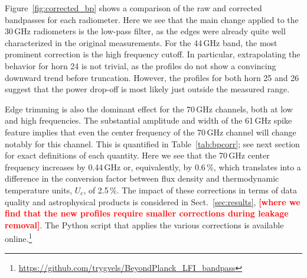 \documentclass[twocolumn]{aa}
\newcommand{\?}[1]{\textcolor{red}{{\bf [#1]}}}
\begin{document}
Figure~\ref{fig:corrected_bp} shows a comparison of the raw and corrected
bandpasses for each radiometer. Here we see that the main change applied to the
30\,GHz radiometers is the low-pass filter, as the edges were already quite well
characterized in the original measurements. For the 44\,GHz band, the most
prominent correction is the high frequency cutoff. In particular, extrapolating
the behavior for horn 24 is not trivial, as the profiles do not show a
convincing downward trend before truncation. However, the profiles for both horn 25 and 26 suggest
that the power drop-off is most likely just outside the measured range. 

Edge trimming is also the dominant effect for the 70\,GHz channels, both at low
and high frequencies. The substantial amplitude and width of the 61\,GHz spike
feature implies that even the center frequency of the 70\,GHz channel will
change notably for this channel. This is quantified in Table~\ref{tab:bpcorr};
see next section for exact definitions of each quantity. Here we see that the
70\,GHz center frequency increases by 0.44\,GHz or, equivalently, by 0.6\,\%,
which translates into a difference in the conversion factor between flux density
and thermodynamic temperature units, $U_c$, of 2.5\,\%. The impact of these
corrections in terms of data quality and astrophysical products is considered in
Sect.~\ref{sec:results}, \?{\textbf{where we find that the new profiles require
smaller corrections during leakage removal}}. The Python script that applies the
various corrections is available
online.\footnote{\url{https://github.com/trygvels/BeyondPlanck_LFI_bandpass}}
\end{document}
